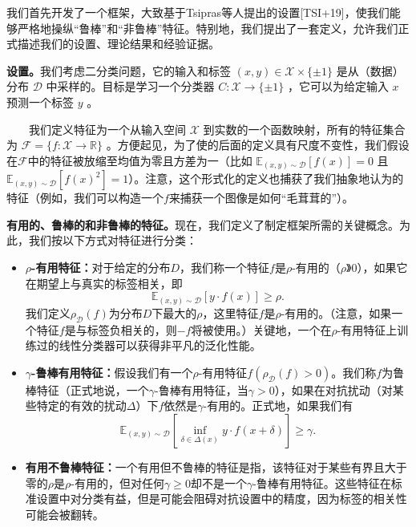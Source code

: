 \documentclass{article}
\begin{document}
我们首先开发了一个框架，大致基于Tsipras等人提出的设置[TSI+19]，使我们能够严格地操纵“鲁棒”和“非鲁棒”特征。特别地，我们提出了一套定义，允许我们正式描述我们的设置、理论结果和经验证据。

\textbf{设置。}我们考虑二分类问题，它的输入和标签 $(x, y) \in \mathcal{X} \times\{ \pm 1\}$ 是从（数据）分布 $\mathcal{D}$ 中采样的。目标是学习一个分类器 $C : \mathcal{X} \rightarrow\{ \pm 1\}$ ，它可以为给定输入 $x$ 预测一个标签 $y$ 。

\ \ \ \ 我们定义特征为一个从输入空间 $\mathcal{X}$ 到实数的一个函数映射，所有的特征集合为 $\mathcal{F}=\{f : \mathcal{X} \rightarrow \mathbb{R}\}$ 。方便起见，为了使的后面的定义具有尺度不变性，我们假设在$\mathcal{F}$中的特征被放缩至均值为零且方差为一（比如 $\mathbb{E}_{(x, y) \sim \mathcal{D}}[f(x)]=0$ 且 $\mathbb{E}_{(x, y) \sim \mathcal{D}}\left[f(x)^{2}\right]=1$）。注意，这个形式化的定义也捕获了我们抽象地认为的特征（例如，我们可以构造一个$f$来捕获一个图像是如何“毛茸茸的”）。

\textbf{有用的、鲁棒的和非鲁棒的特征。}现在，我们定义了制定框架所需的关键概念。为此，我们按以下方式对特征进行分类：
\begin{itemize}
  \item \textbf{$\rho$-有用特征：}对于给定的分布$D$，我们称一个特征$f$是$\rho$-有用的（$\rho 》 0$），如果它在期望上与真实的标签相关，即
  \begin{equation}
    \mathbb{E}_{(x, y) \sim \mathcal{D}}[y \cdot f(x)] \geq \rho.
  \end{equation}
  我们定义$\rho_{\mathcal{D}}(f)$为分布$D$下最大的$\rho$，这里特征$f$是$\rho$-有用的。（注意，如果一个特征$f$是与标签负相关的，则$-f$将被使用。）关键地，一个在$\rho$-有用特征上训练过的线性分类器可以获得非平凡的泛化性能。
  \item \textbf{$\gamma$-鲁棒有用特征：}假设我们有一个$\rho$-有用特征$f\left(\rho_{\mathcal{D}}(f)>0\right)$。我们称$f$为鲁棒特征（正式地说，一个$\gamma$-鲁棒有用特征，当$\gamma > 0$），如果在对抗扰动（对某些特定的有效的扰动$\Delta$）下$f$依然是$\gamma$-有用的。正式地，如果我们有
  \begin{equation}
    \mathbb{E}_{(x, y) \sim \mathcal{D}}\left[\inf _{\delta \in \Delta(x)} y \cdot f(x+\delta)\right] \geq \gamma.
  \end{equation}
  \item \textbf{有用不鲁棒特征：}一个有用但不鲁棒的特征是指，该特征对于某些有界且大于零的$\rho$是$\rho$-有用的，但对任何$\gamma \geq 0$却不是一个$\gamma$-鲁棒有用特征。这些特征在标准设置中对分类有益，但是可能会阻碍对抗设置中的精度，因为标签的相关性可能会被翻转。
\end{itemize}
\end{document}
